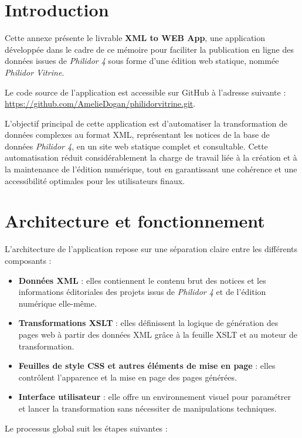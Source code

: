 \section*{Introduction}

Cette annexe présente le livrable \textbf{XML to WEB App}, une application développée dans le cadre de ce mémoire pour faciliter la publication en ligne des données issues de \textit{Philidor 4} sous forme d'une édition web statique, nommée \textit{Philidor Vitrine}.  

Le code source de l'application est accessible sur GitHub à l'adresse suivante :  
\url{https://github.com/AmelieDogan/philidorvitrine.git}.

L'objectif principal de cette application est d'automatiser la transformation de données complexes au format XML, représentant les notices de la base de données \textit{Philidor 4}, en un site web statique complet et consultable. Cette automatisation réduit considérablement la charge de travail liée à la création et à la maintenance de l'édition numérique, tout en garantissant une cohérence et une accessibilité optimales pour les utilisateurs finaux.

\section*{Architecture et fonctionnement}

L'architecture de l'application repose sur une séparation claire entre les différents composants : 

\begin{itemize}
    \item \textbf{Données XML} : elles contiennent le contenu brut des notices et les informations éditoriales des projets issus de \textit{Philidor 4} et de l'édition numérique elle-même.
    \item \textbf{Transformations XSLT} : elles définissent la logique de génération des pages web à partir des données XML grâce à la feuille XSLT et au moteur de transformation.
    \item \textbf{Feuilles de style CSS et autres éléments de mise en page} : elles contrôlent l'apparence et la mise en page des pages générées.
    \item \textbf{Interface utilisateur} : elle offre un environnement visuel pour paramétrer et lancer la transformation sans nécessiter de manipulations techniques.
\end{itemize}

Le processus global suit les étapes suivantes :

